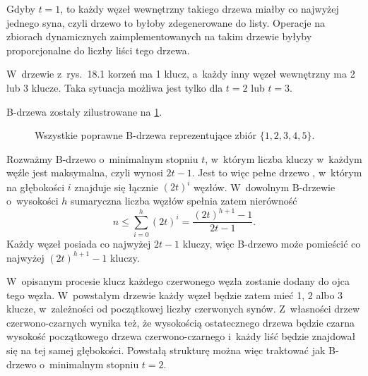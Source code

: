 
\exercise %
Gdyby $t=1$, to każdy węzeł wewnętrzny takiego drzewa miałby co najwyżej jednego syna, czyli drzewo to byłoby zdegenerowane do listy.
Operacje na zbiorach dynamicznych zaimplementowanych na takim drzewie byłyby proporcjonalne do liczby liści tego drzewa.

\exercise %
W~drzewie z~rys.\ 18.1 korzeń ma 1 klucz, a~każdy inny węzeł wewnętrzny ma 2 lub 3 klucze.
Taka sytuacja możliwa jest tylko dla $t=2$ lub $t=3$.

\exercise %
B-drzewa zostały zilustrowane na \ref{fig:18.1-3}.
\begin{figure}[!ht]
	\centering 
	\caption{Wszystkie poprawne B-drzewa reprezentujące zbiór $\{1,2,3,4,5\}$.} \label{fig:18.1-3}
\end{figure}

\exercise %
Rozważmy B-drzewo o~minimalnym stopniu $t$, w~którym liczba kluczy w~każdym węźle jest maksymalna, czyli wynosi $2t-1$.
Jest to więc pełne drzewo , w~którym na głębokości $i$ znajduje się łącznie $(2t)^i$ węzłów.
W~dowolnym B-drzewie o~wysokości $h$ sumaryczna liczba węzłów spełnia zatem nierówność
\[
	n \le \sum_{i=0}^h(2t)^i = \frac{(2t)^{h+1}-1}{2t-1}.
\]
Każdy węzeł posiada co najwyżej $2t-1$ kluczy, więc B-drzewo może pomieścić co najwyżej $(2t)^{h+1}-1$ kluczy.

\exercise %
W~opisanym procesie klucz każdego czerwonego węzła zostanie dodany do ojca tego węzła.
W~powstałym drzewie każdy węzeł będzie zatem mieć 1, 2 albo 3 klucze, w~zależności od początkowej liczby czerwonych synów.
Z~własności drzew czerwono-czarnych wynika też, że wysokością ostatecznego drzewa będzie czarna wysokość początkowego drzewa czerwono-czarnego i~każdy liść będzie znajdował się na tej samej głębokości.
Powstałą strukturę można więc traktować jak B-drzewo o~minimalnym stopniu $t=2$.
